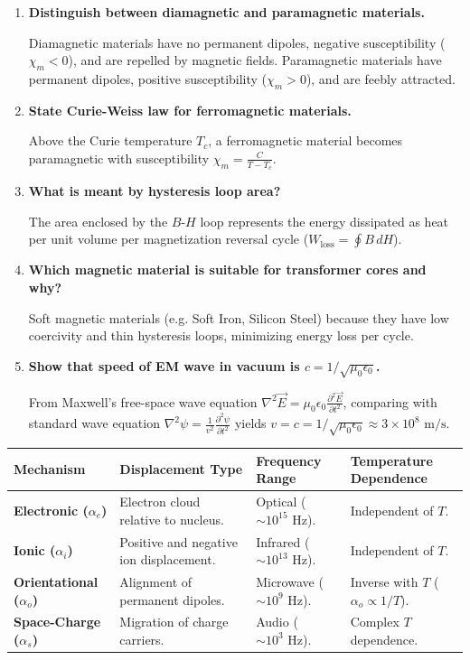 \documentclass[12pt,a4paper]{article}
\newcommand{\Q}[1]{\textbf{#1}\par\noindent\ignorespaces}
\begin{document}
\begin{tcolorbox}[exambox, title={\textbf{Frequently Asked / Viva Questions}}]
\begin{enumerate}[topsep=0pt, label=\textbf{Q\arabic*.}, itemsep=5pt]
  \item \Q{Distinguish between diamagnetic and paramagnetic materials.}
  Diamagnetic materials have no permanent dipoles, negative susceptibility ($\chi_m < 0$), and are repelled by magnetic fields. Paramagnetic materials have permanent dipoles, positive susceptibility ($\chi_m > 0$), and are feebly attracted.

  \item \Q{State Curie-Weiss law for ferromagnetic materials.}
  Above the Curie temperature $T_c$, a ferromagnetic material becomes paramagnetic with susceptibility $\chi_m = \frac{C}{T - T_c}$.

  \item \Q{What is meant by hysteresis loop area?}
  The area enclosed by the $B$-$H$ loop represents the energy dissipated as heat per unit volume per magnetization reversal cycle ($W_{\text{loss}} = \oint B \, dH$).

  \item \Q{Which magnetic material is suitable for transformer cores and why?}
  Soft magnetic materials (e.g. Soft Iron, Silicon Steel) because they have low coercivity and thin hysteresis loops, minimizing energy loss per cycle.

  \item \Q{Show that speed of EM wave in vacuum is $c = 1/\sqrt{\mu_0\epsilon_0}$.}
  From Maxwell's free-space wave equation $\nabla^2 \vec{E} = \mu_0\epsilon_0 \frac{\partial^2\vec{E}}{\partial t^2}$, comparing with standard wave equation $\nabla^2\psi = \frac{1}{v^2}\frac{\partial^2\psi}{\partial t^2}$ yields $v = c = 1/\sqrt{\mu_0\epsilon_0} \approx 3 \times 10^8\text{ m/s}$.
\end{enumerate}
\end{tcolorbox}

\begin{tcolorbox}[tikzbox, title={Summary Comparison of Dielectric Polarization Mechanisms}]
\centering
\begin{tabularx}{\linewidth}{|B{3.2cm}|Y|Y|Y|}
\hline
\textbf{Mechanism} & \textbf{Displacement Type} & \textbf{Frequency Range} & \textbf{Temperature Dependence} \\
\hline
\textbf{Electronic ($\alpha_e$)} & Electron cloud relative to nucleus. & Optical ($\sim 10^{15}\text{ Hz}$). & Independent of $T$. \\
\hline
\textbf{Ionic ($\alpha_i$)} & Positive and negative ion displacement. & Infrared ($\sim 10^{13}\text{ Hz}$). & Independent of $T$. \\
\hline
\textbf{Orientational ($\alpha_o$)} & Alignment of permanent dipoles. & Microwave ($\sim 10^{9}\text{ Hz}$). & Inverse with $T$ ($\alpha_o \propto 1/T$). \\
\hline
\textbf{Space-Charge ($\alpha_s$)} & Migration of charge carriers. & Audio ($\sim 10^{3}\text{ Hz}$). & Complex $T$ dependence. \\
\hline
\end{tabularx}
\end{tcolorbox}
\end{document}
